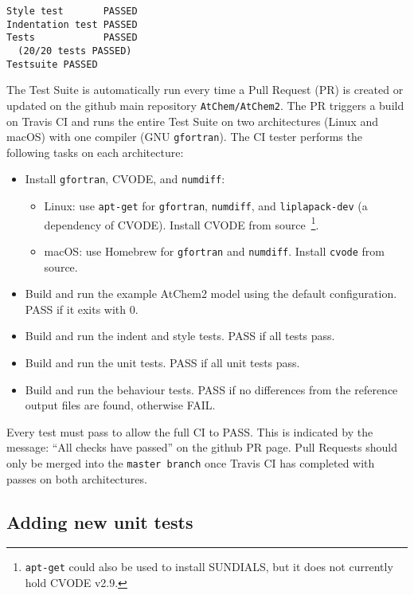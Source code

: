 \begin{verbatim}
Style test       PASSED
Indentation test PASSED
Tests            PASSED
  (20/20 tests PASSED)
Testsuite PASSED
\end{verbatim}

The Test Suite is automatically run every time a Pull Request (PR) is
created or updated on the github main repository
\texttt{AtChem/AtChem2}. The PR triggers a build on Travis CI and runs
the entire Test Suite on two architectures (Linux and macOS) with one
compiler (GNU \texttt{gfortran}). The CI tester performs the following
tasks on each architecture:

\begin{itemize}
\item Install \texttt{gfortran}, CVODE, and \texttt{numdiff}:
  \begin{itemize}
  \item Linux: use \texttt{apt-get} for \texttt{gfortran},
    \texttt{numdiff}, and \texttt{liplapack-dev} (a dependency of
    CVODE). Install CVODE from source~\footnote{\texttt{apt-get} could
      also be used to install SUNDIALS, but it does not currently hold
      CVODE v2.9.}.
  \item macOS: use Homebrew for \texttt{gfortran} and
    \texttt{numdiff}. Install \texttt{cvode} from source.
  \end{itemize}
\item Build and run the example AtChem2 model using the default
  configuration. PASS if it exits with 0.
\item Build and run the indent and style tests. PASS if all tests pass.
\item Build and run the unit tests. PASS if all unit tests pass.
\item Build and run the behaviour tests. PASS if no differences from
  the reference output files are found, otherwise FAIL.
\end{itemize}

Every test must pass to allow the full CI to PASS. This is indicated
by the message: ``All checks have passed'' on the github PR page. Pull
Requests should only be merged into the \texttt{master\ branch} once
Travis CI has completed with passes on both architectures.

\subsection{Adding new unit tests} \label{subsec:adding-new-unit-tests}

